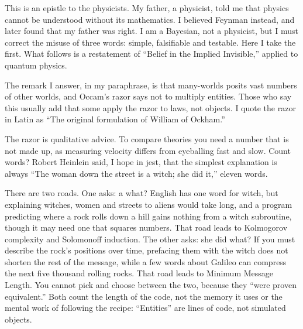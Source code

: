 
This is an epistle to the physicists. My father, a physicist, told me that physics cannot be understood without its mathematics. I believed Feynman instead, and later found that my father was right. I am a Bayesian, not a physicist, but I must correct the misuse of three words: simple, falsifiable and testable. Here I take the first. What follows is a restatement of ``Belief in the Implied Invisible,'' applied to quantum physics.

The remark I answer, in my paraphrase, is that many-worlds posits vast numbers of other worlds, and Occam's razor says not to multiply entities.  Those who say this usually add that some apply the razor to laws, not objects. I quote the razor in Latin as ``The original formulation of William of Ockham.'' 

The razor is qualitative advice. To compare theories you need a number that is not made up, as measuring velocity differs from eyeballing fast and slow. Count words? Robert Heinlein said, I hope in jest, that the simplest explanation is always ``The woman down the street is a witch; she did it,'' eleven words.

There are two roads. One asks: a what? English has one word for witch, but explaining witches, women and streets to aliens would take long, and a program predicting where a rock rolls down a hill gains nothing from a witch subroutine, though it may need one that squares numbers. That road leads to Kolmogorov complexity and Solomonoff induction. The other asks: she did what? If you must describe the rock's positions over time, prefacing them with the witch does not shorten the rest of the message, while a few words about Galileo can compress the next five thousand rolling rocks. That road leads to Minimum Message Length. You cannot pick and choose between the two, because they ``were proven equivalent.''  Both count the length of the code, not the memory it uses or the mental work of following the recipe: ``Entities'' are lines of code, not simulated objects.

